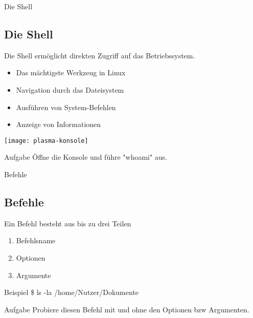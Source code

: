 \begin{frame}{Die Shell}
    \subsection{Die Shell}\label{subsec:die-shell}

    Die Shell ermöglicht direkten Zugriff auf das Betriebssystem.

    \begin{itemize}
        \item Das mächtigste Werkzeug in Linux
        \item Navigation durch das Dateisystem
        \item Ausführen von System-Befehlen
        \item Anzeige von Informationen
    \end{itemize}

    \vspace{0.5cm}
    \texttt{[image: plasma-konsole]}

    \vspace{0.5cm}
    \begin{alertblock}{Aufgabe}
        Öffne die Konsole und führe "whoami" aus.
    \end{alertblock}

\end{frame}

\begin{frame}{Befehle}
    \subsection{Befehle}\label{subsec:befehle}

    Ein Befehl besteht aus bis zu drei Teilen

    \begin{enumerate}
        \item Befehlsname
        \item Optionen
        \item Argumente
    \end{enumerate}

    \vspace{0.5cm}
    \begin{exampleblock}{Beispiel}
        \$ ls -la /home/Nutzer/Dokumente
    \end{exampleblock}

    \vspace{0.5cm}
    \begin{alertblock}{Aufgabe}
        Probiere diesen Befehl mit und ohne den Optionen bzw Argumenten.
    \end{alertblock}

\end{frame}

